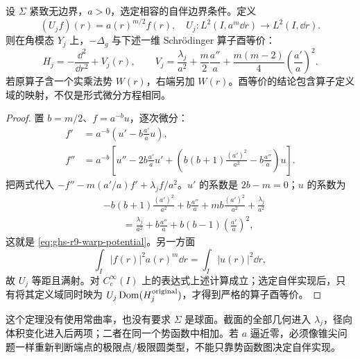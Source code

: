 \begin{theorem}
\label{thm:ghs-r9-warp-unitary}
设 $\Sigma$ 紧致无边界，$a>0$，选定相容的自伴边界条件。定义
\[
(U_j f)(r)=a(r)^{m/2}f(r),\quad
U_j:L^2(I,a^m\dd r)\longrightarrow L^2(I,\dd r).
\]
则在角模态 $Y_j$ 上，$-\Delta_g$ 与下述一维 Schrödinger 算子酉等价：
\begin{equation}\label{eq:ghs-r9-warp-potential}
 H_j=-\frac{\dd^2}{\dd r^2}+V_j(r),\qquad
 V_j=\frac{\lambda_j}{a^2}+\frac m2\frac{a''}{a}
       +\frac{m(m-2)}4\left(\frac{a'}a\right)^2.
\end{equation}
若原算子含一个实乘法势 $W(r)$，右端另加 $W(r)$。酉等价的结论包含算子定义域的映射，不仅是形式微分方程相同。
\end{theorem}
\begin{proof}
置 $b=m/2$、$f=a^{-b}u$，逐次微分：
\begin{align*}
 f'&=a^{-b}\left(u'-b\frac{a'}a u\right),\\
 f''&=a^{-b}\left[u''-2b\frac{a'}a u'
 +\left(b(b+1)\frac{(a')^2}{a^2}-b\frac{a''}a\right)u\right].
\end{align*}
把两式代入 $-f''-m(a'/a)f'+\lambda_j f/a^2$。$u'$ 的系数是 $2b-m=0$；$u$ 的系数为
\begin{align*}
&-b(b+1)\frac{(a')^2}{a^2}+b\frac{a''}a
 +mb\frac{(a')^2}{a^2}+\frac{\lambda_j}{a^2}\\
&\hspace{2em}=\frac{\lambda_j}{a^2}+b\frac{a''}a
 +b(b-1)\left(\frac{a'}a\right)^2,
\end{align*}
这就是 \cref{eq:ghs-r9-warp-potential}。另一方面
\[
\int_I|f(r)|^2a(r)^m\dd r=\int_I|u(r)|^2\dd r,
\]
故 $U_j$ 等距且满射。对 $C_c^\infty(I)$ 上的表达式上述计算成立；选定自伴实现后，只有将其定义域同时映为 $U_j\operatorname{Dom}(H_j^{\rm original})$，才得到严格的算子酉等价。
\end{proof}

这个定理没有使用常曲率，也没有要求 $\Sigma$ 是球面。截面的全部几何进入 $\lambda_j$，径向体积变化进入后两项；二者在同一个势函数中相加。若 $a$ 逼近零，必须像锥尖问题一样重新判断端点的极限点/极限圆类型，不能只靠势函数图决定自伴实现。

